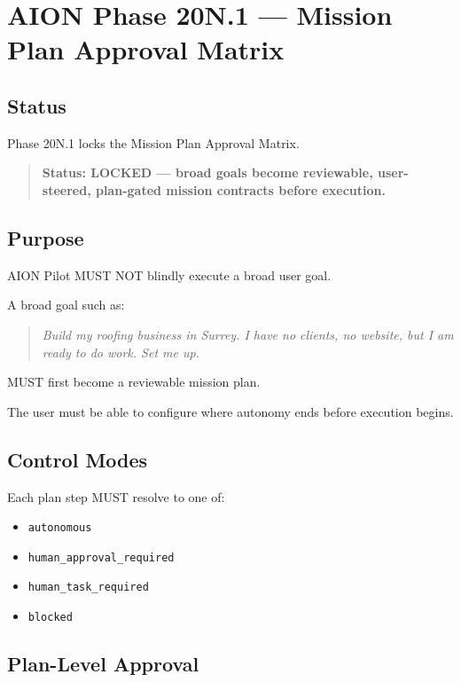 \section{AION Phase 20N.1 --- Mission Plan Approval Matrix}
\label{sec:aion-phase20n1-mission-plan-approval-matrix}

\subsection{Status}

Phase 20N.1 locks the Mission Plan Approval Matrix.

\begin{quote}
\textbf{Status: LOCKED --- broad goals become reviewable, user-steered, plan-gated mission contracts before execution.}
\end{quote}

\subsection{Purpose}

AION Pilot MUST NOT blindly execute a broad user goal.

A broad goal such as:

\begin{quote}
\textit{Build my roofing business in Surrey. I have no clients, no website, but I am ready to do work. Set me up.}
\end{quote}

MUST first become a reviewable mission plan.

The user must be able to configure where autonomy ends before execution begins.

\subsection{Control Modes}

Each plan step MUST resolve to one of:

\begin{itemize}
  \item \texttt{autonomous}
  \item \texttt{human\_approval\_required}
  \item \texttt{human\_task\_required}
  \item \texttt{blocked}
\end{itemize}

\subsection{Plan-Level Approval}

